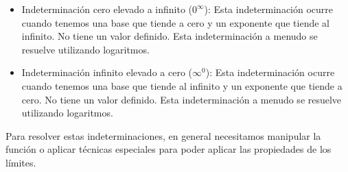 \documentclass[a4paper,12pt]{article}
\begin{document}
\begin{itemize}
\item Indeterminación cero elevado a infinito ($0^\infty$): Esta indeterminación ocurre cuando tenemos una base que tiende a cero y un exponente que tiende al infinito. No tiene un valor definido. Esta indeterminación a menudo se resuelve utilizando logaritmos.

\item Indeterminación infinito elevado a cero ($\infty^0$): Esta indeterminación ocurre cuando tenemos una base que tiende al infinito y un exponente que tiende a cero. No tiene un valor definido. Esta indeterminación a menudo se resuelve utilizando logaritmos.
\end{itemize}

Para resolver estas indeterminaciones, en general necesitamos manipular la función o aplicar técnicas especiales para poder aplicar las propiedades de los límites. 
\end{document}
